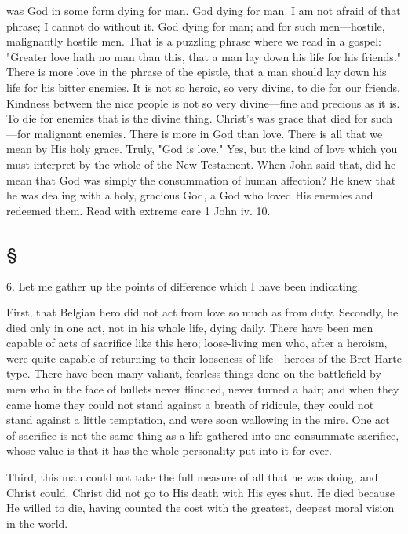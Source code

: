 \documentclass[draft]{ptfdoc}
\begin{document}
was God in some form dying for man. God 
dying for man. I am not afraid of that phrase; 
I cannot do without it. God dying for man; 
and for such men---hostile, malignantly hostile 
men. That is a puzzling phrase where we read 
in a gospel: "Greater love hath no man than 
this, that a man lay down his life for his 
friends." There is more love in the phrase 
of the epistle, that a man should lay down 
his life for his bitter enemies. It is not so 
heroic, so very divine, to die for our friends. 
Kindness between the nice people is not so 
very divine---fine and precious as it is. To die 
for enemies that is the divine thing. Christ's 
was grace that died for such---for malignant 
enemies. There is more in God than love. 
There is all that we mean by His holy grace. 
Truly, "God is love." Yes, but the kind of love 
which you must interpret by the whole of 
the New Testament. When John said that, did 
he mean that God was simply the consummation 
of human affection? He knew that he 
was dealing with a holy, gracious God, a God 
who loved His enemies and redeemed them. 
Read with extreme care 1 John iv. 10. 

\subsection*{ \S }

6. Let me gather up the points of difference 
which I have been indicating. 

First, that Belgian hero did not act from love 
so much as from duty. Secondly, he died only 
in one act, not in his whole life, dying daily. 
There have been men capable of acts of sacrifice 
like this hero; loose-living men who, after 
a heroism, were quite capable of returning to 
their looseness of life---heroes of the Bret Harte 
type. There have been many valiant, fearless 
things done on the battlefield by men who in 
the face of bullets never flinched, never turned 
a hair; and when they came home they could 
not stand against a breath of ridicule, they 
could not stand against a little temptation, and 
were soon wallowing in the mire. One act of 
sacrifice is not the same thing as a life gathered 
into one consummate sacrifice, whose value is 
that it has the whole personality put into it 
for ever. 

Third, this man could not take the full 
measure of all that he was doing, and Christ 
could. Christ did not go to His death with 
His eyes shut. He died because He willed to 
die, having counted the cost with the greatest, 
deepest moral vision in the world. 
\end{document}
